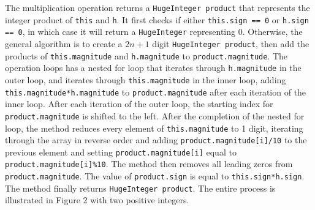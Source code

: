 \documentclass[12pt]{article}
\newcommand{\code}[1]{\texttt{#1}}
\begin{document}
The multiplication operation returns a \code{HugeInteger product} that represents the integer product of \code{this} and \code{h}. It first checks if either \code{this.sign == 0} or \code{h.sign == 0}, in which case it will return a \code{HugeInteger} representing $0$. Otherwise, the general algorithm is to create a $2n+1$ digit \code{HugeInteger product}, then add the products of \code{this.magnitude} and \code{h.magnitude} to \code{product.magnitude}. The operation loops has a nested for loop that iterates through \code{h.magnitude} in the outer loop, and iterates through \code{this.magnitude} in the inner loop, adding \code{this.magnitude*h.magnitude} to \code{product.magnitude} after each iteration of the inner loop. After each iteration of the outer loop, the starting index for \code{product.magnitude} is shifted to the left. After the completion of the nested for loop, the method reduces every element of \code{this.magnitude} to 1 digit, iterating through the array in reverse order and adding \code{product.magnitude[i]/10} to the previous element and setting \code{product.magnitude[i]} equal to \code{product.magnitude[i]\%10}. The method then removes all leading zeros from \code{product.magnitude}. The value of \code{product.sign} is equal to \code{this.sign*h.sign}. The method finally returns \code{HugeInteger product}. The entire process is illustrated in Figure 2 with two positive integers. 
\end{document}

